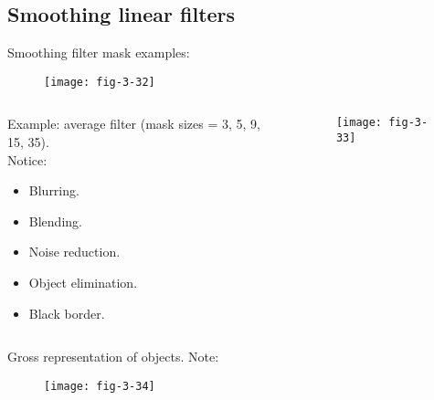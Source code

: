 
\subsection{Smoothing linear filters}


\begin{frame}
Smoothing filter mask examples:
\begin{figure}
\centering
\texttt{[image: fig-3-32]}
\end{figure}
\end{frame}


\begin{frame}
\begin{columns}
\begin{column}{.5\textwidth}
Example: average filter (mask sizes = 3, 5, 9, 15, 35).\\
Notice:
\begin{itemize}
\item Blurring.
\item Blending.
\item Noise reduction.
\item Object elimination.
\item Black border.
\end{itemize}
\end{column}
\begin{column}{.5\textwidth}
\begin{figure}
\centering
\texttt{[image: fig-3-33]}
\end{figure}
\end{column}
\end{columns}
\end{frame}


\begin{frame}
Gross representation of objects.
Note:
\begin{figure}
\centering
\texttt{[image: fig-3-34]}
\end{figure}
\end{frame}

